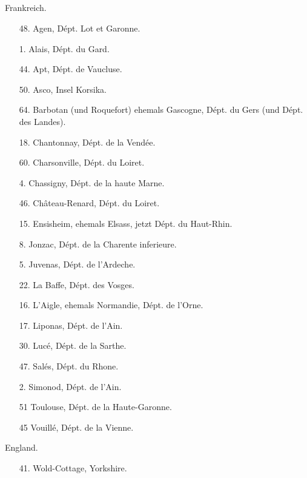 \documentclass[a4paper, 11pt, oneside, polutonikogreek, german]{article}
\begin{document}
\subsection{}
\subsubsection{}
\begin{center}
Frankreich.
\end{center}
\begin{itemize}
    
    \item[48.] Agen, Dépt. Lot et Garonne.
    \item[1.] Alais, Dépt. du Gard.
    \item[44.] Apt, Dépt. de Vaucluse.
    \item[50.] Asco, Insel Korsika.
    \item[64.] Barbotan (und Roquefort) ehemals Gascogne, Dépt. du Gers (und Dépt. des Landes).
    \item[18.] Chantonnay, Dépt. de la Vendée.
    \item[60.] Charsonville, Dépt. du Loiret.
    \item[4.] Chassigny, Dépt. de la haute Marne.
    \item[46.] Château-Renard, Dépt. du Loiret.
    \item[15.] Ensisheim, ehemals Elsass, jetzt Dépt. du Haut-Rhin.
    \item[8.] Jonzac, Dépt. de la Charente inferieure.
    \item[5.] Juvenas, Dépt. de l'Ardeche.
    \item[22.] La Baffe, Dépt. des Vosges.
    \item[16.] L'Aigle, ehemals Normandie, Dépt. de l'Orne.
    \item[17.] Liponas, Dépt. de l'Ain.
    \item[30.] Lucé, Dépt. de la Sarthe.
    \item[47.] Salés, Dépt. du Rhone.
    \item[2.] Simonod, Dépt. de l'Ain.
    \item[51] Toulouse, Dépt. de la Haute-Garonne.
    \item[45] Vouillé, Dépt. de la Vienne.
\end{itemize}
\begin{center}
England.
\end{center}
\begin{itemize}
    
    \item[41.] Wold-Cottage, Yorkshire.
\end{itemize}
\end{document}
